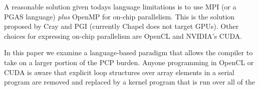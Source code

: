 A reasonable solution given todays language limitations is to use MPI (or a PGAS
language) \emph{plus} OpenMP for on-chip parallelism.  This is the solution proposed
by Cray and PGI \cite{BOF_SC10} (currently Chapel does not target GPUs\cite{Brad?}).
Other choices for expressing on-chip parallelism are OpenCL\cite{OPENCL} and NVIDIA's CUDA.

In this paper we examine a language-based paradigm that allows the compiler to
take on a larger portion of the PCP burden.  Anyone programming in OpenCL or
CUDA is aware that explicit loop structures over array elements in a serial
program are removed and replaced by a kernel program that is run over all of
the
